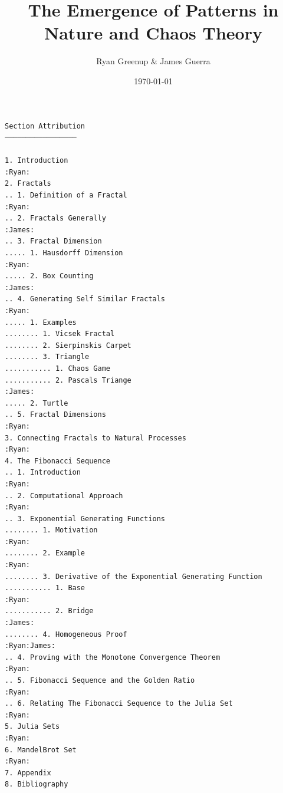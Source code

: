 \documentclass[11pt]{article}
\author{Ryan Greenup \& James Guerra}
\date{\today}
\title{The Emergence of Patterns in Nature and Chaos Theory}
\begin{document}
\maketitle
\tableofcontents

\begin{verbatim}
Section Attribution
─────────────────

1. Introduction                                                   :Ryan:
2. Fractals
.. 1. Definition of a Fractal                                     :Ryan:
.. 2. Fractals Generally                                         :James:
.. 3. Fractal Dimension
..... 1. Hausdorff Dimension                                      :Ryan:
..... 2. Box Counting                                            :James:
.. 4. Generating Self Similar Fractals                            :Ryan:
..... 1. Examples
........ 1. Vicsek Fractal
........ 2. Sierpinskis Carpet
........ 3. Triangle
........... 1. Chaos Game
........... 2. Pascals Triange                                   :James:
..... 2. Turtle
.. 5. Fractal Dimensions                                          :Ryan:
3. Connecting Fractals to Natural Processes                       :Ryan:
4. The Fibonacci Sequence
.. 1. Introduction                                                :Ryan:
.. 2. Computational Approach                                      :Ryan:
.. 3. Exponential Generating Functions
........ 1. Motivation                                            :Ryan:
........ 2. Example                                               :Ryan:
........ 3. Derivative of the Exponential Generating Function
........... 1. Base                                               :Ryan:
........... 2. Bridge                                            :James:
........ 4. Homogeneous Proof                               :Ryan:James:
.. 4. Proving with the Monotone Convergence Theorem               :Ryan:
.. 5. Fibonacci Sequence and the Golden Ratio                     :Ryan:
.. 6. Relating The Fibonacci Sequence to the Julia Set            :Ryan:
5. Julia Sets                                                     :Ryan:
6. MandelBrot Set                                                 :Ryan:
7. Appendix
8. Bibliography
\end{verbatim}
\end{document}
